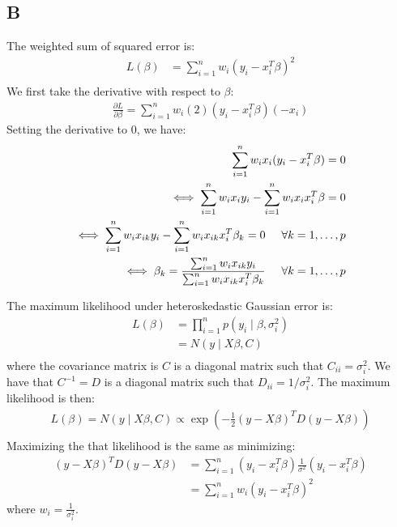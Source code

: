 \documentclass{article}
\begin{document}
\subsection*{B}
The weighted sum of squared error is:
\begin{align*}
L(\beta) &= \sum_{i=1}^n w_i (y_i - x_i^T\beta)^2\\
\end{align*}
We first take the derivative with respect to \(\beta\):
\begin{align*}
\frac{\partial L}{\partial \beta} = \sum_{i=1}^n w_i (2) (y_i - x_i^T\beta) (-x_i)
\end{align*}
Setting the derivative to \(0\), we have:
\begin{align*}
\sum_{i=1}^n w_i x_i (y_i - x_i^T\beta) = 0\\
\iff \sum_{i=1}^n w_i x_i y_i - \sum_{i=1}^n w_i x_i x_i^T\beta = 0\\
\iff \sum_{i=1}^n w_i x_{ik} y_i - \sum_{i=1}^n w_i x_{ik} x_{i}^T\beta_k = 0 \hspace{0.5cm} \forall k = 1, \ldots, p \\
\iff \beta_k = \frac{\sum_{i=1}^n w_i x_{ik} y_i}{\sum_{i=1}^n w_i x_{ik} x_{i}^T\beta_k} \hspace{0.5cm} \forall k = 1, \ldots, p \\
\end{align*}

The maximum likelihood under heteroskedastic Gaussian error is:
\begin{align*}
L(\beta) &= \prod_{i=1}^n p(y_i \mid \beta, \sigma_i^2)\\
&= N(y \mid X\beta, C)\\
\end{align*}
where the covariance matrix is \(C\) is a diagonal matrix such that \(C_{ii} = \sigma^2_i\). We have that \(C^{-1} = D\) is a diagonal matrix such that \(D_{ii} = 1/\sigma^2_i\).
The maximum likelihood is then:
\begin{align*}
L(\beta) = N(y \mid X\beta, C) \propto \exp\left(-\frac{1}{2}(y - X\beta)^TD(y - X\beta)\right)\\
\end{align*}
Maximizing the that likelihood is the same as minimizing:
\begin{align*}
(y - X\beta)^TD(y - X\beta) &= \sum_{i=1}^n (y_i - x_i^T\beta)\frac{1}{\sigma^2}(y_i - x_i^T\beta)\\
&= \sum_{i=1}^n w_i (y_i - x_i^T\beta)^2
\end{align*}
where \(w_i = \frac{1}{\sigma_i^2}\).
\end{document}
